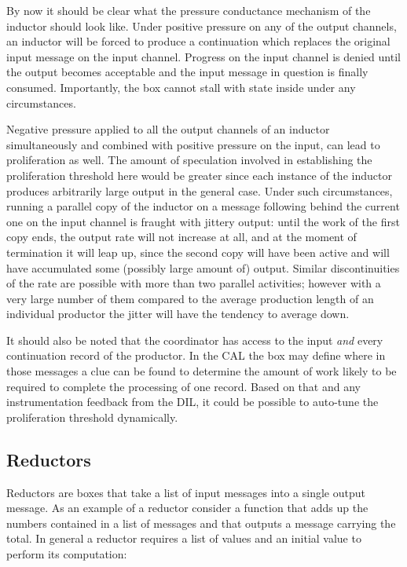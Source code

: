 \documentclass[11pt]{report}
\begin{document}
By now it should be clear what the pressure conductance mechanism of the inductor should look like. Under positive pressure on any of the output channels,
an inductor will be forced to produce a continuation which replaces the original input message on the input channel. Progress on the input channel is
denied until the output becomes acceptable and the input message in question is finally consumed. Importantly, the box cannot stall with state inside
under any circumstances.

Negative pressure applied to all the output channels of an inductor simultaneously and combined  with positive pressure on the input, can lead to
proliferation as well. The amount of speculation involved in establishing the proliferation threshold here would be greater since each instance of
the inductor produces arbitrarily large output in the general case. Under such circumstances, running a parallel copy of the inductor on a message following behind the current one on the input channel is fraught with jittery output: until the work of the first copy ends, the output rate
will not increase at all, and at the moment of termination it will leap up, since the second copy will have been active and will have accumulated
some (possibly large amount of) output. Similar discontinuities of the rate are possible with more than two
parallel activities; however with a very large number of them compared to the average production length of an individual productor the
jitter will have the tendency to average down.

It should also be noted that the coordinator has access to the input {\em and} every continuation record of the productor. In the CAL
the box may define where in those messages a clue can be found to determine the amount of work likely to be required to complete the
processing of one record. Based on that and any instrumentation feedback from the DIL, it could be possible to auto-tune the proliferation
threshold dynamically.

\subsection{Reductors}

Reductors are boxes that take a list of input messages into a single output message. As an example of a reductor consider a function
that adds up the numbers contained in a list of messages and that outputs a message carrying the total. In general a reductor requires
a list of values and an initial value to perform its computation:
\end{document}
